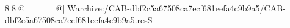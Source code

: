 8  8  @|                                                  @| W   archive:/CAB-dbf2c5a67508ca7ecf681eefa4c9b9a5/CAB-dbf2c5a67508ca7ecf681eefa4c9b9a5.resS 